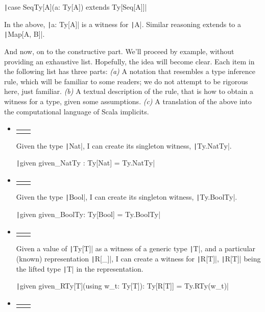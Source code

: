 \documentclass[11pt]{article}
\newcommand{\infrule}[3]{\begin{tabular}{ll} \fbox{\textsf{#1}} & \inference{#2}{#3} \end{tabular}}
\newcommand{\ScalaI}[1]{\texttt|#1|}
\newcommand{\FirstEtcX}[1]{\marginpar{\faCube{ \smaller #1}}\xspace}
\begin{document}
\ScalaI{case SeqTy[A](a: Ty[A]) extends Ty[Seq[A]]}

\noindent In the above, \ScalaI{a: Ty[A]} is a witness for \ScalaI{A}. Similar reasoning extends to a \ScalaI{Map[A, B]}.

And now, on to the constructive\FirstEtcX{2} part. We'll proceed by example, without providing an exhaustive list. Hopefully, the idea will become clear. Each item in the following list has three parts: \textit{(a)} A notation that resembles a type inference rule, which will be familiar to some readers; we do not attempt to be rigorous here, just familiar. \textit{(b)} A textual description of the rule, that is how to obtain a witness for a type, given some assumptions. \textit{(c)} A translation of the above into the computational language of Scala implicits.

\begin{itemize}
  \item
  \infrule{NAT-TY-W}%
  {\ScalaI{Nat}: Type}%
  {w(\ScalaI{Nat}) = \ScalaI{Ty.NatTy}}
  
  Given the type \ScalaI{Nat}, I can create its singleton witness, \ScalaI{Ty.NatTy}.
  
  \ScalaI{given given_NatTy : Ty[Nat] = Ty.NatTy}
  
  \item
  \infrule{BOOL-TY-W}%
  {\ScalaI{Bool}: Type}%
  {w(\ScalaI{Bool}) = \ScalaI{Ty.BoolTy}}
  
  Given the type \ScalaI{Bool}, I can create its singleton witness, \ScalaI{Ty.BoolTy}.
  
  \ScalaI{given given_BoolTy: Ty[Bool] = Ty.BoolTy}
  
  \item
  \infrule{R-TY-W}%
  {w(\ScalaI{T}): \ScalaI{Ty[T]}, \quad \ScalaI{R[_]}: Type}%
  {w(\ScalaI{R[T]}): \ScalaI{Ty[R[T]]} = \ScalaI{Ty.RTy(w(T))}}
  
  Given a value of \ScalaI{Ty[T]} as a witness of a generic type \ScalaI{T}, and a particular (known) representation \ScalaI{R[_]}, I can create a witness for \ScalaI{R[T]}, \ScalaI{R[T]} being the lifted type \ScalaI{T} in the representation.
  
  \ScalaI{given given_RTy[T](using w_t: Ty[T]): Ty[R[T]] = Ty.RTy(w_t)}
  
  \item
  \infrule{FUN1-TY-W}%
  {w(\ScalaI{A}): \ScalaI{Ty[A]}, \quad w(\ScalaI{Z}): \ScalaI{Ty[Z]}}%
  {w(\ScalaI{A => Z}): \ScalaI{Ty[A => Z]} = \ScalaI{Ty.Fun1Ty(w(A), w(Z))}}
  

\end{itemize}
\end{document}
